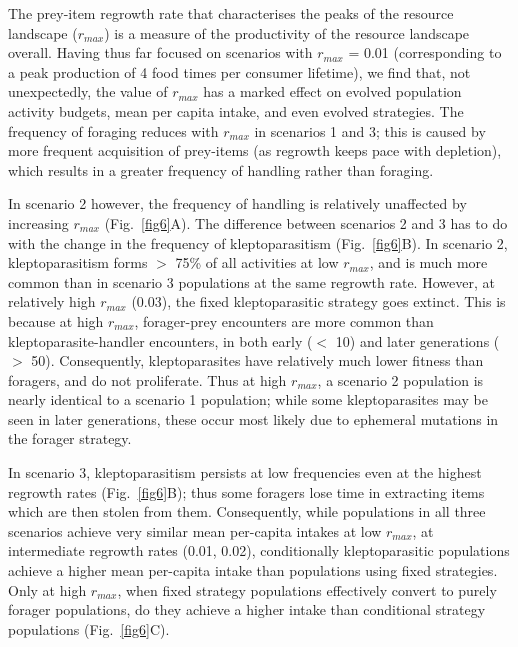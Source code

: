 \begin{refsection}[sorting=nyt]
The prey-item regrowth rate that characterises the peaks of the resource landscape ($r_{max}$) is a measure of the productivity of the resource landscape overall. 
Having thus far focused on scenarios with $r_{max}$ = 0.01 (corresponding to a peak production of 4 food times per consumer lifetime), we find that, not unexpectedly, the value of $r_{max}$ has a marked effect on evolved population activity budgets, mean per capita intake, and even evolved strategies.
The frequency of foraging reduces with $r_{max}$ in scenarios 1 and 3; this is caused by more frequent acquisition of prey-items (as regrowth keeps pace with depletion), which results in a greater frequency of handling rather than foraging.

In scenario 2 however, the frequency of handling is relatively unaffected by increasing $r_{max}$ (Fig.~\ref{fig6}A).
The difference between scenarios 2 and 3 has to do with the change in the frequency of kleptoparasitism (Fig.~\ref{fig6}B).
In scenario 2, kleptoparasitism forms $>$ 75\% of all activities at low $r_{max}$, and is much more common than in scenario 3 populations at the same regrowth rate.
However, at relatively high $r_{max}$ (0.03), the fixed kleptoparasitic strategy goes extinct.
This is because at high $r_{max}$, forager-prey encounters are more common than kleptoparasite-handler encounters, in both early ($<$ 10) and later generations ($>$ 50).
Consequently, kleptoparasites have relatively much lower fitness than foragers, and do not proliferate.
Thus at high $r_{max}$, a scenario 2 population is nearly identical to a scenario 1 population; while some kleptoparasites may be seen in later generations, these occur most likely due to ephemeral mutations in the forager strategy.

In scenario 3, kleptoparasitism persists at low frequencies even at the highest regrowth rates (Fig.~\ref{fig6}B); thus some foragers lose time in extracting items which are then stolen from them.
Consequently, while populations in all three scenarios achieve very similar mean per-capita intakes at low $r_{max}$, at intermediate regrowth rates (0.01, 0.02), conditionally kleptoparasitic populations achieve a higher mean per-capita intake than populations using fixed strategies.
Only at high $r_{max}$, when fixed strategy populations effectively convert to purely forager populations, do they achieve a higher intake than conditional strategy populations (Fig.~\ref{fig6}C).


\end{refsection}
